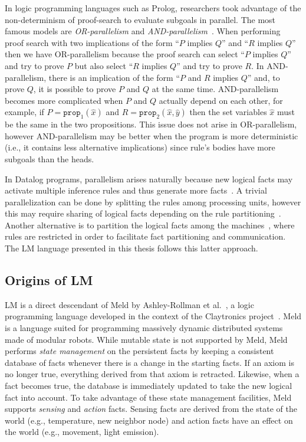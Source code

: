 In logic programming languages such as Prolog, researchers took advantage of the
non-determinism of proof-search to evaluate subgoals in parallel. The most
famous models are \emph{OR-parallelism} and
\emph{AND-parallelism}~\cite{Gupta:2001:PEP:504083.504085}. When performing
proof search with two implications of the form ``$P$ implies $Q$'' and ``$R$
implies $Q$'' then we have OR-parallelism because the proof search can select
``$P$ implies $Q$'' and try to prove $P$ but also select ``$R$ implies $Q$'' and
try to prove $R$. In AND-parallelism, there is an implication of the form ``$P$
and $R$ implies $Q$'' and, to prove $Q$, it is possible to prove $P$ and $Q$ at
the same time. AND-parallelism becomes more complicated when $P$ and $Q$
actually depend on each other, for example, if $P = \mathtt{prop}_1(\hat{x})$
and $R = \mathtt{prop}_2(\hat{x}, \hat{y})$ then the set variables $\hat{x}$
must be the same in the two propositions. This issue does not arise in
OR-parallelism, however AND-parallelism may be better when the program is more
deterministic (i.e., it contains less alternative implications) since rule's
bodies have more subgoals than the heads.

In Datalog programs, parallelism arises naturally because new logical facts may
activate multiple inference rules and thus generate more
facts~\cite{Ganguly:1990:FPP:93597.98724,Seib:1991:PDP:113413.113435,Wolfson:1988:DPL:971701.50242}.
A trivial parallelization can be done by splitting the rules among processing
units, however this may require sharing of logical facts depending on the rule
partitioning~\cite{Wolfson:1988:DPL:971701.50242}. Another alternative is to
partition the logical facts among the
machines~\cite{183073,Loo-condie-garofalakis-p2}, where rules are restricted in
order to facilitate fact partitioning and communication. The LM language
presented in this thesis follows this latter approach.

\subsection{Origins of LM}

LM is a direct descendant of Meld by Ashley-Rollman et
al.~\cite{ashley-rollman-iclp09,ashley-rollman-derosa-iros07wksp}, a logic
programming language developed in the context of the Claytronics
project~\cite{goldstein-computer05}. Meld is a language suited for programming
massively dynamic distributed systems made of modular robots. While mutable
state is not supported by Meld, Meld performs \emph{state management} on the
persistent facts by keeping a consistent database of facts whenever there is a
change in the starting facts. If an axiom is no longer true, everything derived
from that axiom is retracted. Likewise, when a fact becomes true, the database
is immediately updated to take the new logical fact into account. To take
advantage of these state management facilities, Meld supports \emph{sensing} and
\emph{action} facts. Sensing facts are derived from the state of the world
(e.g., temperature, new neighbor node) and action facts have an
effect on the world (e.g., movement, light emission).

